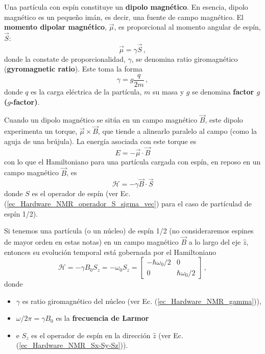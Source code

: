 
Una partícula con espín constituye un \textbf{dipolo magnético}. En esencia, dipolo magnético es un pequeño imán, es decir, una fuente de campo magnético. El \textbf{momento dipolar magnético}, $\vec{\mu}$, es proporcional al momento angular de espín, $\vec{S}$:
	\begin{equation} \label{ec_Hardware_NMR_mu}
	\vec{\mu} = \gamma \vec{S}\, ,
	\end{equation}
donde la constate de proporcionalidad, $\gamma$, se denomina ratio giromagnético (\textbf{gyromagnetic ratio}). Este toma la forma
	\begin{equation} \label{ec_Hardware_NMR_gamma}
	\gamma = g \frac{q}{2m} \, ,
	\end{equation}
donde $q$ es la carga eléctrica de la partícula, $m$ su masa y $g$ se denomina \textbf{factor $g$ ($g$-factor)}. 

Cuando un dipolo magnético se sitúa en un campo magnético $\vec{B}$, este dipolo experimenta un torque, $\vec{\mu} \times \vec{B}$, que tiende a alinearlo paralelo al campo (como la aguja de una brújula). La energía asociada con este torque es
	\begin{equation}
		E = - \vec{\mu} \cdot \vec{B}
		\end{equation}	
con lo que el Hamiltoniano para una partícula cargada con espín, en reposo en un campo magnético $\vec{B}$, es
	\begin{equation}
	\mathcal{H} = - \gamma \vec{B} \cdot \vec{S}
	\end{equation}
donde $S$ es el operador de espín (ver Ec. (\ref{ec_Hardware_NMR_operador_S_sigma_vec}) para el caso de partículad de espín 1/2).

Si tenemos una partícula (o un núcleo) de espín 1/2 (no consideraremos espines de mayor orden en estas notas) en un campo magnético $\vec{B}$ a lo largo del eje $\hat{z}$, entonces su evolución temporal está gobernada por el Hamiltoniano
	\begin{equation} \label{ec_Hardware_NMR_H_sys_1}
	\boxed{\mathcal{H} = -  \gamma B_0 S_z = - \omega_0 S_z = 
	\begin{bmatrix}
	- \hbar \omega_0/2  & 0 \\
	0  &  \hbar \omega_0 /2
	\end{bmatrix}} \, ,
	\end{equation}
donde 
\begin{itemize}
	\item $\gamma$ es ratio giromagnético del núcleo (ver Ec. (\ref{ec_Hardware_NMR_gamma})),
	\item $\omega/2 \pi = \gamma B_0 $ es la \textbf{frecuencia de Larmor}
	\item e $S_z$ es el operador de espín en la dirección $\hat{z}$ (ver Ec. (\ref{ec_Hardware_NMR_Sx-Sy-Sz})).
\end{itemize}

